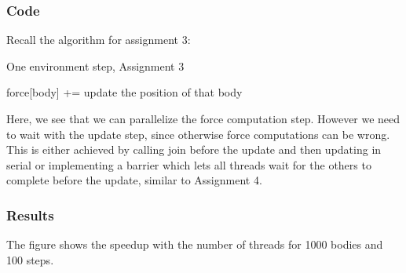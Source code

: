 \documentclass[a4paper]{scrartcl}
\begin{document}
        \subsubsection{Code}
            Recall the algorithm for assignment 3:
            \begin{algorithm}[H]
                \caption{One environment step, Assignment 3}
                \begin{algorithmic}[1]
                        \State force[body] += 
                    \EndFor
                \EndFor
                \State update the position of that body
                \EndFor
                \EndProcedure
                \end{algorithmic}
            \end{algorithm}

            Here, we see that we can parallelize the force computation step. However
            we need to wait with the update step, since otherwise force
            computations can be wrong. This is either achieved by calling join
            before the update and then updating in serial or implementing a
            barrier which lets all threads wait for the others to complete
            before the update, similar to Assignment 4.

        \subsubsection{Results}
            The figure shows the speedup with the number of threads for 1000
            bodies and 100 steps.
\end{document}
